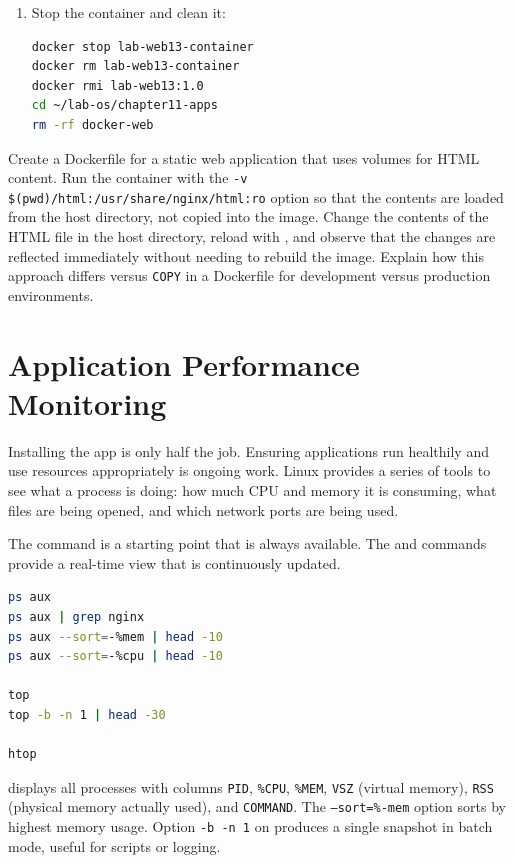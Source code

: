 \begin{enumerate}
\item Stop the container and clean it:
\begin{lstlisting}[language=bash, caption={Clean the container and image}]
docker stop lab-web13-container
docker rm lab-web13-container
docker rmi lab-web13:1.0
cd ~/lab-os/chapter11-apps
rm -rf docker-web
\end{lstlisting}
\end{enumerate}

\begin{challengebox}
Create a Dockerfile for a static web application that uses volumes for HTML content. Run the container with the \texttt{-v \$(pwd)/html:/usr/share/nginx/html:ro} option so that the contents are loaded from the host directory, not copied into the image. Change the contents of the HTML file in the host directory, reload with , and observe that the changes are reflected immediately without needing to rebuild the image. Explain how this approach differs versus \texttt{COPY} in a Dockerfile for development versus production environments.
\end{challengebox}

\section{Application Performance Monitoring}
\label{sec:app-monitoring}

Installing the app is only half the job. Ensuring applications run healthily and use resources appropriately is ongoing work. Linux provides a series of tools to see what a process is doing: how much CPU and memory it is consuming, what files are being opened, and which network ports are being used.

The  command is a starting point that is always available. The  and  commands provide a real-time view that is continuously updated.

\begin{lstlisting}[language=bash, caption={Monitoring processes with ps and top}]
ps aux
ps aux | grep nginx
ps aux --sort=-%mem | head -10
ps aux --sort=-%cpu | head -10

top
top -b -n 1 | head -30

htop
\end{lstlisting}

 displays all processes with columns \texttt{PID}, \texttt{\%CPU},
\texttt{\%MEM}, \texttt{VSZ} (virtual memory), \texttt{RSS} (physical memory
actually used), and \texttt{COMMAND}. The \texttt{--sort=\%-mem} option sorts by highest memory usage. Option \texttt{-b -n 1} on
 produces a single snapshot in batch mode, useful for scripts or
logging.

